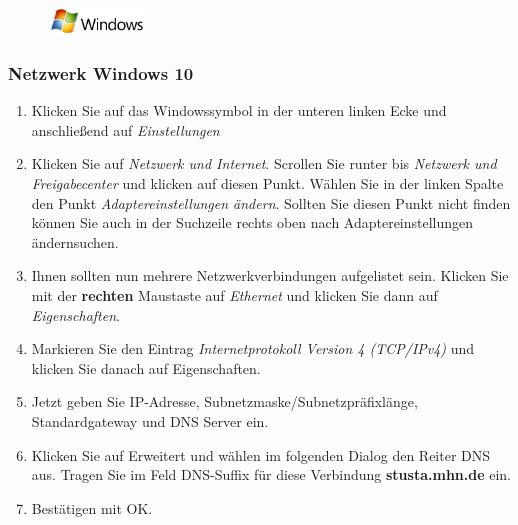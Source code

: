 \documentclass[a4paper,12pt]{scrartcl}
\begin{document}
\begin{figure}[h]
	\raggedleft
	\vspace{-35pt}
	\includegraphics[height=0.7cm,keepaspectratio]{Bilder/Windows_logo}
	\vspace{-25pt}
\end{figure}

\subsubsection*{Netzwerk Windows 10}

\begin{minipage}{0.6\textwidth}
\begin{enumerate}
	\item Klicken Sie auf das Windowssymbol in der unteren linken Ecke und anschließend auf \emph{Einstellungen}
	\item Klicken Sie auf \textit{Netzwerk und Internet}. Scrollen Sie runter bis \textit{Netzwerk und Freigabecenter} und klicken auf diesen Punkt. Wählen Sie in der linken Spalte den Punkt \textit{Adaptereinstellungen ändern}. Sollten Sie diesen Punkt nicht finden können Sie auch in der Suchzeile rechts oben nach \glqq Adaptereinstellungen ändern\grqq suchen.

    \item Ihnen sollten nun mehrere Netzwerkverbindungen aufgelistet sein. Klicken Sie mit der \textbf{rechten} Maustaste auf \textit{Ethernet} und klicken Sie dann auf \textit{Eigenschaften}.
    \item Markieren Sie den Eintrag \textit{Internetprotokoll Version 4 (TCP/IPv4)} und klicken Sie danach auf Eigenschaften.
    \item Jetzt geben Sie IP-Adresse, Subnetzmaske/Subnetzpräfixlänge, Standardgateway und DNS Server ein.
    \item Klicken Sie auf Erweitert und wählen im folgenden Dialog den Reiter DNS aus. Tragen Sie im Feld DNS-Suffix für diese Verbindung \textbf{stusta.mhn.de} ein.
    \item Bestätigen mit OK.
\end{enumerate}
\end{minipage}
\end{document}
